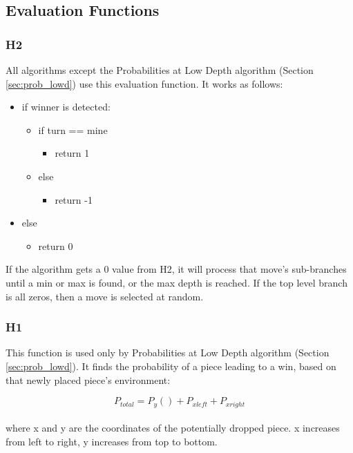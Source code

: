 \documentclass[12pt]{article}
\begin{document}
\pagebreak


\subsection{Evaluation Functions}

\subsubsection{H2}
All algorithms except the Probabilities at Low Depth algorithm (Section \ref{sec:prob_lowd}) use this evaluation function. It works as follows:
\begin{itemize}
	\item if winner is detected:
	\begin{itemize}
		\item if turn == mine
		\begin{itemize}
			\item return 1
		\end{itemize}
		\item else
		\begin{itemize}
			\item return -1
		\end{itemize}
	\end{itemize}
	\item else
	\begin{itemize}
		\item return 0
	\end{itemize}
\end{itemize}

If the algorithm gets a 0 value from H2, it will process that move's sub-branches until a min or max is found,
or the max depth is reached. If the top level branch is all zeros, then a move is selected at random.

\subsubsection{H1}
\label{sec:h1}
This function is used only by Probabilities at Low Depth algorithm (Section \ref{sec:prob_lowd}). It finds the probability of a piece leading to a win, based on that newly placed piece's environment:

\begin{equation}
	P_{total} = P_{y}() + P_{x left} + P_{x right}
 \end{equation} \\

where x and y are the coordinates of the potentially dropped piece. x increases from left to right, y increases from top to bottom.
\end{document}
